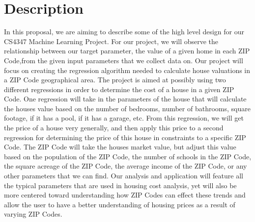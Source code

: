 \section{Description}

In this proposal, we are aiming to describe some of the high level design for our CS4347 Machine Learning Project. For our project, we will observe the relationship between our target parameter, the value of a given home in each ZIP Code,from the given input parameters that we collect data on. Our project will focus on creating the regression algorithm needed to calculate house valuations in a ZIP Code geographical area. The project is aimed at possibly using two different regressions in order to determine the cost of a house in a given ZIP Code. One regression will take in the parameters of the house that will calculate the houses value based on the number of bedrooms, number of bathrooms, square footage, if it has a pool, if it has a garage, etc. From this regression, we will get the price of a house very generally, and then apply this price to a second regression for determining the price of this house in constraints to a specific ZIP Code. The ZIP Code will take the houses market value, but adjust this value based on the population of the ZIP Code, the number of schools in the ZIP Code, the square acreage of the ZIP Code, the average income of the ZIP Code, or any other parameters that we can find. Our analysis and application will feature all the typical parameters that are used in housing cost analysis, yet will also be more centered toward understanding how ZIP Codes can effect these trends and allow the user to have a better understanding of housing prices as a result of varying ZIP Codes. 